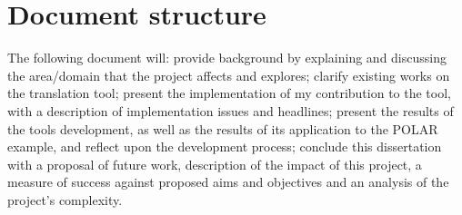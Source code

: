 \section{Document structure}
The following document will: provide background by explaining and discussing the area/domain that the project affects and explores; clarify existing works on the translation tool; present the implementation of my contribution to the tool, with a description of implementation issues and headlines; present the results of the tools development, as well as the results of its application to the POLAR example, and reflect upon the development process; conclude this dissertation with a proposal of future work, description of the impact of this project, a measure of success against proposed aims and objectives and an analysis of the project's complexity.
